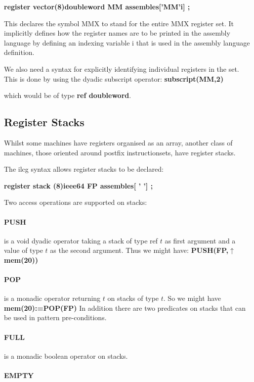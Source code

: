 {{\textbf{register vector(8)doubleword MM assembles{[}'MM'i{]} ;}

This declares the symbol MMX to stand for the entire MMX register
set. It implicitly defines how the register names are to be printed
in the assembly language by defining an indexing variable i that is
used in the assembly language definition.

We also need a syntax for explicitly identifying individual registers
in the set. This is done by using the dyadic subscript operator: \textbf{subscript(MM,2)}

which would be of type \textbf{ref doubleword}. 


\subsection{Register Stacks}

Whilst some machines have registers organised as an array, another
class of machines, those oriented around postfix instructionsets,
have register stacks.

The ilcg syntax allows register stacks to be declared:

\textbf{register stack (8)ieee64 FP assembles{[} ' '{]} ;}

Two access operations are supported on stacks: 


\paragraph{PUSH}

is a void dyadic operator taking a stack of type ref $t$ as first
argument and a value of type $t$ as the second argument. Thus we
might have:  \textbf{PUSH(FP,$\uparrow $mem(20)) }


\paragraph{POP}

is a monadic operator returning $t$ on stacks of type $t$. So we
might have \textbf{mem(20):=POP(FP)}  In addition there are two predicates
on stacks that can be used in pattern pre-conditions. 


\paragraph{FULL}

is a monadic boolean operator on stacks. 


\paragraph{EMPTY}

}}
